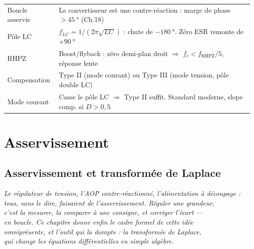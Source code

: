 \documentclass[12pt,a4paper,twoside]{book}
\begin{document}
\begin{ingenieur}[title={\color{white} Résumé --- Niveau Ingénieur}]
\begin{center}
\renewcommand{\arraystretch}{1.3}
\begin{tabular}{p{3.5cm}p{9.5cm}}
\toprule
Boucle asservie & Le convertisseur est une contre-réaction : marge de phase $> \SI{45}{°}$ (Ch.18) \\
Pôle LC & $f_{LC} = 1/(2\pi\sqrt{LC})$ : chute de $-\SI{180}{°}$. Zéro ESR remonte de $+\SI{90}{°}$ \\
RHPZ & Boost/flyback : zéro demi-plan droit $\Rightarrow$ $f_c < f_{\text{RHPZ}}/5$, réponse lente \\
Compensation & Type II (mode courant) ou Type III (mode tension, pôle double LC) \\
Mode courant & Casse le pôle LC $\Rightarrow$ Type II suffit. Standard moderne, slope comp. si $D > 0{,}5$ \\
\bottomrule
\end{tabular}
\end{center}
\end{ingenieur}


\part{Asservissement}


\chapter{Asservissement et transformée de Laplace}

\begin{center}
\textit{Le régulateur de tension, l'AOP contre-réactionné, l'alimentation à découpage :\\
tous, sans le dire, faisaient de l'asservissement. Réguler une grandeur,\\
c'est la mesurer, la comparer à une consigne, et corriger l'écart ---\\
en boucle. Ce chapitre donne enfin le cadre formel de cette idée\\
omniprésente, et l'outil qui la dompte : la transformée de Laplace,\\
qui change les équations différentielles en simple algèbre.}
\end{center}
\end{document}
